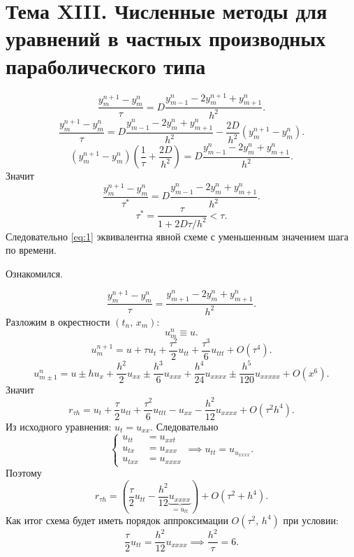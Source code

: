 \documentclass[a4paper]{article}
\begin{document}
\section*{Тема XIII. Численные методы для уравнений в
частных производных параболического типа}
\begin{hiProb}[7.3]
\end{hiProb}
\begin{sol}
\[
\frac{y_m^{n+1}-y_m^n}{\tau}=D \frac{y_{m-1}^n-2y_m^{n+1}+
y_{m+1}^n}{h^2}
\tag{*}
\label{eq:1}
.\] 
\[
	\frac{y_m^{n+1}-y_m^n}{\tau}= D \frac{y_{m-1}^n-2y_m^n
	+y_{m+1}^n}{h^2}- \frac{2D}{h^2}\left( 
y_m^{n+1}-y_m^n\right) 
.\] 
\[
	\left( y_m^{n+1}-y_m^n \right) \left( 
	\frac{1}{\tau}+ \frac{2D}{h^2}\right) =D \frac{
y_{m-1}^n-2y_m^n+y_{m+1}^n}{h^2}
.\] 
Значит
\[
\frac{y_{m}^{n+1}-y_m^n}{\tau^*}=
D \frac{y_{m-1}^n-2y_m^n+y_{m+1}^n}{h^2}
.\] 
\[
	\tau^*= \frac{\tau}{1+ 2D\tau /h^2}<\tau
.\] 
Следовательно \eqref{eq:1} эквивалентна явной схеме
с уменьшенным значением шага по времени.
\end{sol}
\begin{hiProb}[8.3]
\end{hiProb}
\begin{sol}
Ознакомился.
\end{sol}
\begin{hiProb}[9.3]
\end{hiProb}
\begin{sol}
\[
\frac{y_m^{n+1}-y_m^n}{\tau}= \frac{y_{m+1}^n-2 y_m^n+y_{m+1}^n
}{h^2}
.\] 
Разложим в окрестности $\left( t_n,\,x_m \right) $:
\[
u_m^n \equiv u
.\] 
\[
u_{m}^{n+1}=u + \tau u_t + \frac{\tau^2}{2}u_{t t}
+ \frac{\tau^3}{6} u_{ t t t}+ O\left( \tau^4 \right) 
.\] 
\[
u_{m\pm 1}^n= u \pm h u_{x} + \frac{h^2}{2}u_{x x}\pm 
\frac{h^3}{6} u_{x x x}+ \frac{h^4}{24} u_{x x x x}\pm 
\frac{h^5}{120}u_{x x x x x} + O\left( x^6 \right) 
.\] 
Значит
\[
r_{\tau h}= u_t + \frac{\tau}{2} u_{t t}+
\frac{\tau^2}{6}u_{t t t }-u_{x x}-\frac{h^2}{12}u_{x x x x}
+ O\left( \tau^2 h^4 \right) 
.\] 
Из исходного уравнения: $u_t=u_{x x}$. Следовательно
\[
\left\{
\begin{aligned}
	u_{tt}&= u_{x x t} \\
	u_{t x}&= u _{x x x} \\
	u_{t x x}&= u_{x x x x}
\end{aligned}
\right.
\implies u_{t t}=u_{u_{x x x x}}
.\] 
Поэтому
\[
	r_{\tau h}= \left( \frac{\tau}{2}u_{t t}-
	\frac{h^2}{12}\underbrace{u_{x x x x}}_{=u_{t t}}\right) +O\left( \tau^2+h^4 \right) 
.\] 
Как итог схема будет иметь порядок аппроксимации $O\left( \tau^2,\,h^4 \right) $ при условии:
\[
\frac{\tau}{2}u_{tt}=\frac{h^2}{12}u_{x x x x}\implies
\frac{h^2}{\tau}= 6
.\] 
\end{sol}
\end{document}
